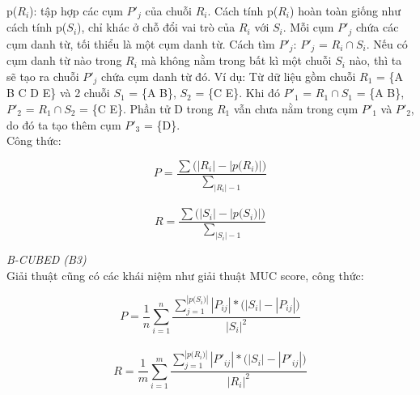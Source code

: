 \documentclass[12pt]{extarticle}
\begin{document}
					\par p($R_i$): tập hợp các cụm $P'_j$ của chuỗi $R_i$. Cách tính p($R_i$) hoàn toàn giống như cách tính p($S_i$), chỉ khác ở chỗ đổi vai trò của $R_i$ với $S_i$. Mỗi cụm $P'_j$ chứa các cụm danh từ, tối thiểu là một cụm danh từ. Cách tìm $P'_j$: $P'_j$ = $R_i \cap S_i$. Nếu có cụm danh từ nào trong $R_i$ mà không nằm trong bất kì một chuỗi $S_i$ nào, thì ta sẽ tạo ra chuỗi $P'_j$ chứa cụm danh từ đó. Ví dụ: Từ dữ liệu gồm chuỗi $R_1$ = \{A B C D E\} và 2  chuỗi $S_1$ = \{A B\}, $S_2$ = \{C E\}. Khi đó $P'_1$ = $R_1 \cap S_1$ = \{A B\}, $P'_2$ = $R_1 \cap S_2$ = \{C E\}. Phần tử D trong $R_1$ vẫn chưa nằm trong cụm $P'_1$ và $P'_2$, do đó ta tạo thêm cụm $P'_3$ = \{D\}.
					\\Công thức:					
						\begin{center}
							\begin{equation*}
								P = \frac{\sum \big(|R_i| - |p \big(R_i)|)}{\sum_{|R_i| - 1}}
							\end{equation*}
							\\
							\begin{equation*}
								R = \frac{\sum \big(|S_i| - |p \big(S_i)|)}{\sum_{|S_i| - 1}}
							\end{equation*}												
						\end{center}

						\textit{B-CUBED (B3)}
						\\Giải thuật cũng có các khái niệm như giải thuật MUC score, công thức:
						\begin{center}
							\begin{equation*}
								P = \frac{1}{n} \sum_{i=1}^{n} \frac{\sum_{j=1}^{|p \big(S_i)|} |P_{ij}|*\big(|S_i| - |P_{ij}|)} {|S_{i}|^2}
							\end{equation*}
							\\
							\begin{equation*}
								R = \frac{1}{m} \sum_{i=1}^{m} \frac{\sum_{j=1}^{|p \big(R_i)|} |P'_{ij}|*\big(|S_i| - |P'_{ij}|)} {|R_{i}|^2}
							\end{equation*}												
						\end{center}
\end{document}
